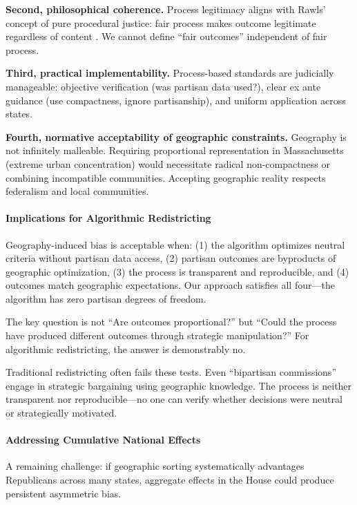 \textbf{Second, philosophical coherence.} Process legitimacy aligns with Rawls' concept of pure procedural justice: fair process makes outcome legitimate regardless of content \citep{rawls1971}. We cannot define ``fair outcomes'' independent of fair process.

\textbf{Third, practical implementability.} Process-based standards are judicially manageable: objective verification (was partisan data used?), clear ex ante guidance (use compactness, ignore partisanship), and uniform application across states.

\textbf{Fourth, normative acceptability of geographic constraints.} Geography is not infinitely malleable. Requiring proportional representation in Massachusetts (extreme urban concentration) would necessitate radical non-compactness or combining incompatible communities. Accepting geographic reality respects federalism and local communities.

\paragraph{Implications for Algorithmic Redistricting}

Geography-induced bias is acceptable when: (1) the algorithm optimizes neutral criteria without partisan data access, (2) partisan outcomes are byproducts of geographic optimization, (3) the process is transparent and reproducible, and (4) outcomes match geographic expectations. Our approach satisfies all four---the algorithm has zero partisan degrees of freedom.

The key question is not ``Are outcomes proportional?'' but ``Could the process have produced different outcomes through strategic manipulation?'' For algorithmic redistricting, the answer is demonstrably no.

Traditional redistricting often fails these tests. Even ``bipartisan commissions'' engage in strategic bargaining using geographic knowledge. The process is neither transparent nor reproducible---no one can verify whether decisions were neutral or strategically motivated.

\paragraph{Addressing Cumulative National Effects}

A remaining challenge: if geographic sorting systematically advantages Republicans across many states, aggregate effects in the House could produce persistent asymmetric bias.

